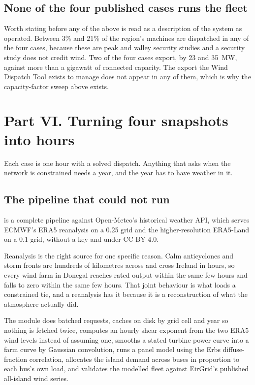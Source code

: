 \documentclass[11pt,a4paper]{article}
\begin{document}

\subsection{None of the four published cases runs the fleet}

Worth stating before any of the above is read as a description of the system as
operated. Between 3\% and 21\% of the region's machines are dispatched in any
of the four cases, because these are peak and valley security studies and a
security study does not credit wind. Two of the four cases export, by 23 and
35~MW, against more than a gigawatt of connected capacity. The export the Wind
Dispatch Tool exists to manage does not appear in any of them, which is why the
capacity-factor sweep above exists.

\clearpage
\section{Part VI. Turning four snapshots into hours}
\label{sec:hours}

Each case is one hour with a solved dispatch. Anything that asks when the
network is constrained needs a year, and the year has to have weather in it.

\subsection{The pipeline that could not run}

 is a complete pipeline against Open-Meteo's historical
weather API, which serves ECMWF's ERA5 reanalysis on a 0.25\textdegree{} grid and the higher-resolution ERA5-Land on a 0.1\textdegree{} grid, without a key and under CC BY 4.0.

Reanalysis is the right source for one specific reason. Calm anticyclones and
storm fronts are hundreds of kilometres across and cross Ireland in hours, so
every wind farm in Donegal reaches rated output within the same few hours and
falls to zero within the same few hours. That joint behaviour is what loads a
constrained tie, and a reanalysis has it because it is a reconstruction of what
the atmosphere actually did.

The module does batched requests, caches on disk by grid cell and year so
nothing is fetched twice, computes an hourly shear exponent from the two ERA5
wind levels instead of assuming one, smooths a stated turbine power curve into
a farm curve by Gaussian convolution, runs a panel
model using the Erbs diffuse-fraction correlation, allocates
the island demand across buses in proportion to each bus's own load, and
validates the modelled fleet against EirGrid's published all-island wind
series.
\end{document}
